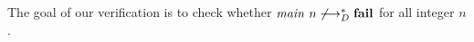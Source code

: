The goal of our verification is to check whether ${\mathit{main}}~{n}
\not\longrightarrow^*_D \mathbf{fail}$ for all integer $n$.

%
%
%


%
%
%
%
%
%
%
%
%
%
%
%
%
%
%
%
%
%
%
%
